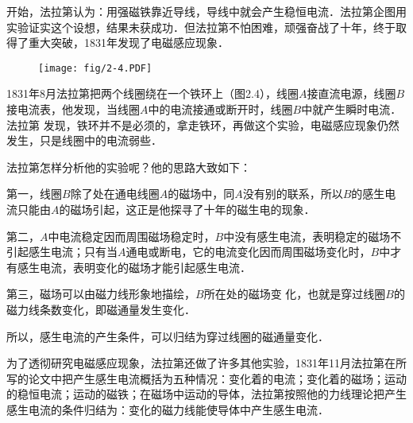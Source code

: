 开始，法拉第认为：用强磁铁靠近导线，导线中就会产生稳恒电流．法拉第企图用实验证实这个设想，结果未获成功．但法拉第不怕困难，顽强奋战了十年，终于取得了重大突破，1831年发现了电磁感应现象．
\begin{figure}[htp]\centering
\texttt{[image: fig/2-4.PDF]}
\caption{}
\end{figure}

1831年8月法拉第把两个线圈绕在一个铁环上（图2.4），线圈$A$接直流电源，线圈$B$接电流表，他发现，当线圈$A$中的电流接通或断开时，线圈$B$中就产生瞬时电流．法拉第
发现，铁环并不是必须的，拿走铁环，再做这个实验，电磁感应现象仍然发生，只是线圈中的电流弱些．

法拉第怎样分析他的实验呢？他的思路大致如下：

第一，线圈$B$除了处在通电线圈$A$的磁场中，同$A$没有别的联系，所以$B$的感生电流只能由$A$的磁场引起，这正是他探寻了十年的磁生电的现象．

第二，$A$中电流稳定因而周围磁场稳定时，$B$中没有感生电流，表明稳定的磁场不引起感生电流；只有当$A$通电或断电，它的电流变化因而周围磁场变化时，$B$中才有感生电流，表明变化的磁场才能引起感生电流．

第三，磁场可以由磁力线形象地描绘，$B$所在处的磁场变
化，也就是穿过线圈$B$的磁力线条数变化，即磁通量发生变化．

所以，感生电流的产生条件，可以归结为穿过线圈的磁通量变化．

为了透彻研究电磁感应现象，法拉第还做了许多其他实验，1831年11月法拉第在所写的论文中把产生感生电流概括为五种情况：变化着的电流；变化着的磁场；运动的稳恒电流；运动的磁铁；在磁场中运动的导体，法拉第按照他的力线理论把产生感生电流的条件归结为：变化的磁力线能使导体中产生感生电流．

